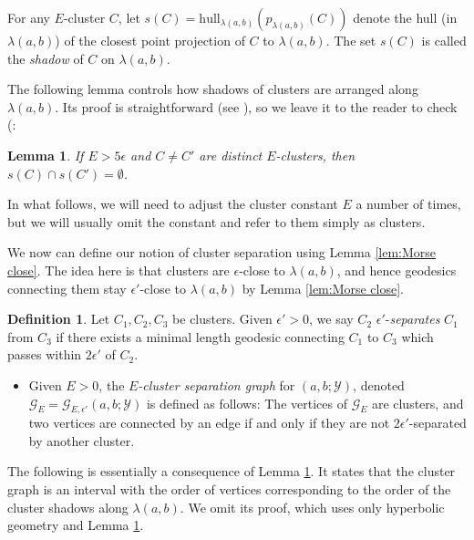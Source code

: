 \documentclass{amsart}
\newtheorem{lemma}[theorem]{Lemma}
\theoremstyle{definition}
\newtheorem{definition}[theorem]{Definition}
\theoremstyle{remark}
\theoremstyle{definition}
\newcommand{\calG}{\mathcal{G}}
\newcommand{\calY}{\mathcal{Y}}
\newcommand{\hull}{\mathrm{hull}}
\begin{document}
For any $E$-cluster $C$, let $s(C) = \hull_{\lambda(a,b)}(p_{\lambda(a,b)}(C))$ denote the hull (in $\lambda(a,b)$) of the closest point projection of $C$ to $\lambda(a,b)$.  The set $s(C)$ is called the \emph{shadow} of $C$ on $\lambda(a,b)$.

The following lemma controls how shadows of clusters are arranged along $\lambda(a,b)$. Its proof is straightforward (see \cite[Lemma 3.6]{DMS_bary}), so we leave it to the reader to check (:

\begin{lemma} \label{lem:cluster arrangement}
If $E > 5\epsilon$ and $C \neq C'$ are distinct $E$-clusters, then $s(C) \cap s(C') = \emptyset$.
\end{lemma}




In what follows, we will need to adjust the cluster constant $E$ a number of times, but we will usually omit the constant and refer to them simply as clusters.

We now can define our notion of cluster separation using Lemma \ref{lem:Morse close}.  The idea here is that clusters are $\epsilon$-close to $\lambda(a,b)$, and hence geodesics connecting them stay $\epsilon'$-close to $\lambda(a,b)$ by Lemma \ref{lem:Morse close}.

\begin{definition}
Let $C_1, C_2, C_3$ be clusters.  Given $\epsilon'>0$, we say $C_2$ $\epsilon'$-\emph{separates} $C_1$ from $C_3$ if there exists a minimal length geodesic connecting $C_1$ to $C_3$ which passes within $2\epsilon'$ of $C_2$.

\begin{itemize}
\item Given $E>0$, the \emph{$E$-cluster separation graph} for $(a,b; \calY)$, denoted $\calG_E = \calG_{E,\epsilon'}(a,b;\calY)$ is defined as follows: The vertices of $\calG_E$ are clusters, and two vertices are connected by an edge if and only if they are not $2\epsilon'$-separated by another cluster.
\end{itemize}
\end{definition}


The following is essentially a consequence of Lemma \ref{lem:cluster arrangement}.  It states that the cluster graph is an interval with the order of vertices corresponding to the order of the cluster shadows along $\lambda(a,b)$.  We omit its proof, which uses only hyperbolic geometry and Lemma \ref{lem:cluster arrangement}.
\end{document}

